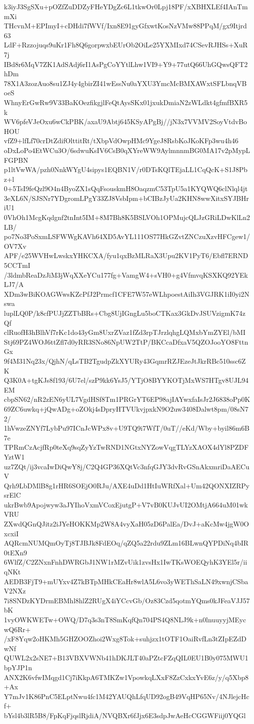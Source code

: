 k3iyJ3SgSXu+pOZfZuDDZyFHeYDgZc6L1tkwOr0Lpj18PF/xXBHXLEf4IAnTmmXi
THcvnM+EPImyI+cDHdi7fWVf/Ixn8E91gyGfxwtKosNzVMw88PPqM/gx9Itjrd63
LdF+Rzzojuqs9uKr1Fh8Q6gorpwxbEUrOb2OiLe25YXMIxd74CSevRJHSs+XuR7j
IBd8r6MqV7ZK1AdSAdj6rI1AsPgCoYYtlLhw1VI9+Y9+77utQ66UhGQwsQFT2hDm
78X1A3zozAuo8su1ZJ4y4gbirZI41wEssNu0aYXU3YmcMcBMXAWxtSFLbnqVBoeS
WhnyErGwRw9V33BaKOezfikgjlFeQtAysSKx01jxukDmiaN2zWLdkt4gfmfBXR5k
WV6pfeVJeOxu6wCkPBK/axaU9Abtj645KSyAPgBj//jN3x7VVMV2SoyVtdvBoHOU
vfZ9+lfLf70crDtZdifOlttitRt/tXbpVdOwpHMc9YgeJ8RsbKoJKoKFp3wu4h46
oDxLoPo4EtWCu3O/6sdwuKsIV6CsB0qXYreWW9AylmnnmBG0MA17v2pMypLFGPBN
p1ltVwWA/pzh0NnkWYgU4sipys1EQBN1V/r0DTsKQlTEjaLL1CqQcK+S1J8Pbz+l
0+5TsI9feQzl9O4n4ByoZX1sQqFsouskmH8OaqzmC53TpU5a1KYQWQ6clNlql4jt
3eXL6N/SJSNr7YDgromLPgY33ZJ8VsbIpm+bCIBzJyUa2KHN8wwXitxSYJBHriU1
0VhOh1McgKqdgnf2tnInt5IM+8M7Bh8K5BSLVOh1OPMujcQLJzGRiLDwKlLn2LB/
po7No3PoSxmLSFWWgKAVh64XD5AvYL111OS77HkGZvtZNCzuXzvHFCgew1/OV7Xv
APF/e25WVHwLwskxYHKCXA/fyu1qxBzMLRaX3Upu2KV1PyT6/Ebfl7ERND5CCTmI
/3ldmbReaDzJiM3jWqXXeYCu177fg+VamgW4+sVH0+g4VfmvqKSXKQ92YEkLJ7/A
XDm3wBiKOAGWwsKZcPfJ2Prmcf1CFE7W57eWLhpoestAiIh3VGJRK1iI0yi2Nswa
luplLQ0P/k8cfPUJjZZTbBRs+Cbg8UjIGngLu5boCTKax3GkDvJSUVzigmK74zQf
clRuofH3hBlhVf7rKc1do43yGm8UxrZVaz1fZd3rpTJrzlqhgLQMxbYmZYEl/bMI
Stj69PZ4WOJ6ttZfl7d0yRR3SNo86NpUW2TtP/BKCcaDfxaV5QZOJooYO8FttnGx
9f4M31Nq23x/QjhN/qLsTB2TgudpZkXYURy43GqmrRZJEzeJtJkrRBc510ssc6ZK
Q3K0A+tgKJs8f193/6U7el/szP9kk6YsJ5/YTjO8BYYKOTjMxWS7HTgv8UJL94EM
cbpSN62/nR2zEN6yUL7VgdHSf8Tm1PRGrYT6EP98ajIAYwxfaIsJr2J6838oPp0K
69ZC6uwkq+jQwADg+oZOkj4sDpryHTVUkvjpxkN9O2uw3408Dalwt8pm/08sN72/
1hVwzeZNYf7LybPu97ICnJcWPx8v+U9TQ9i7WfT/0uT//eKd/Wby+byil86m6B7e
TPRmCzAcjfRp0teXq9sqZyYzTwRND1NGtxNYZowVqgTLYzXAOX4dYl8PZDFYztW1
uz7ZQt/ij3vcaIwDiQwY8j/C2Q4GP36XQtVc3nfqGJY3dvRvGSnAkxmriDaAECuV
Qrh9LbDMlB8g1rHR6SOEjO0RJu/AXE4uDd1HtIuWRfXal+Um42QONXIZRPysrElC
ukrBwb9Apojwyw3aJYIhoVxmVCoxEjutgP+V7vB0KUJvUI2OMtjA664uM01wkVRU
ZXwdQGnQJitz2iJYeHOKKMp2W8A4vyXaH05zD6PalEa/DvJ+aKcMw4jgW0OxcxiI
AQRcmNUMQmOyTj8TJBJk8FdEOq/qZQ5a22rdu9ZLm16BLwnQYPDiNq4bIR0tEXn9
6WlfZ/C2ZNxnFnhDWRGbJ1NW1rMZvUik1zvsHx1IwTKsWOEQyhK3YEl5r/iiqNKt
AEDB3FjT9+mUYxv4Z7kBTpMHkCEaHr8wlA5L6vo3yWEThSaLN49xwnjCSbaV2NXz
7i8SNDzKYDrmEBMhl8hlZ2RUgX4iYCcvGb/Oz83Czd5qotmYQms0kJFeaVJJ57bK
1vyOWKWETw+OWQ/D7q3s3nT8SmKqfQn704PS4Q8NLJ9k+n0lnuuyyjMEycwQ6Rr+
/xF8Yqw2oHKMh5GHZOOZhoi2Wxg8Tok+suhjzx1tOTF1OaiRvfLn3tZIpEZdDwNf
QUWL2x2sNE7+B13VBXVWNb41hDKJLT40aPZtcFZqQIL0EU1B0y075MWU1bpYJP1n
ANX2K6vfwIMqgd1Cj7iKkpA6TMKZw1VpowkqLXxF8ZzCxkxYvE6z/y/q5Xbp8+Ax
Y7mJv1K86PnC5ELptNwu4fc1M42YAUQhLfqUD92ogB49VqHP65Nv/4NJlejcHcf+
bYsl4b3lR5B8/FpKqFjqslRjdiA/NVQBXr6fJjx6E3sdpJwAeHcCGGWFiij0YQGl
